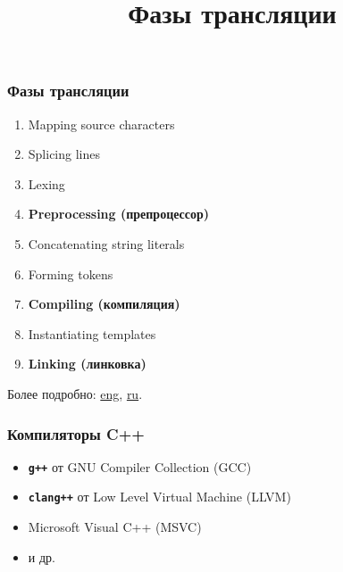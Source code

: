 \documentclass[compress, 10pt, aspectratio=169]{beamer}
\title{Фазы трансляции}
\begin{document}
\frame[plain]{\titlepage}

\begin{frame}

    \frametitle{Фазы трансляции}

    \begin{enumerate}

        \item Mapping source characters

        \item Splicing lines

        \item Lexing

        \item \textbf{Preprocessing (препроцессор)}

        \item Concatenating string literals

        \item Forming tokens

        \item \textbf{Compiling (компиляция)}

        \item Instantiating templates

        \item \textbf{Linking (линковка)}

    \end{enumerate}

    \vfill

    Более подробно:
    \href{https://en.cppreference.com/w/cpp/language/translation_phases}{eng},
    \href{https://ru.cppreference.com/w/cpp/language/translation_phases}{ru}.

\end{frame}

\begin{frame}

    \frametitle{Компиляторы C++}

    \begin{itemize}

        \item \texttt{\textbf{g++}} от GNU Compiler Collection (GCC)

        \item \texttt{\textbf{clang++}} от Low Level Virtual Machine (LLVM)

        \item Microsoft Visual C++ (MSVC)

        \item и др.

    \end{itemize}

\end{frame}
\end{document}
